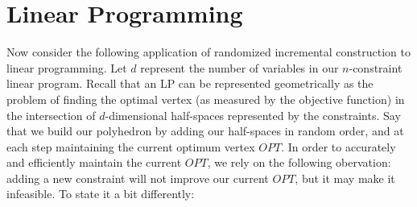 \documentclass{article}
\begin{document}
\section{Linear Programming}
Now consider the following application of randomized incremental construction to linear 
programming.  Let $d$ represent the number of variables in our $n$-constraint linear program.
Recall that an LP can be represented geometrically as the problem of finding the optimal vertex 
(as measured by the objective function) in the intersection of $d$-dimensional half-spaces 
represented by the constraints.  Say that we build our polyhedron by adding our half-spaces in 
random order, and at each step maintaining the current optimum vertex $OPT$.  In order to accurately 
and efficiently maintain the current $OPT$, we rely on the following obervation: adding a new 
constraint will not improve our current $OPT$, but it may make it infeasible.  To state it a bit 
differently:
\end{document}
